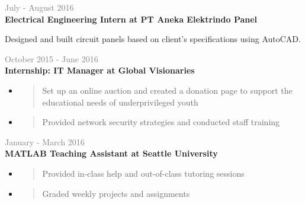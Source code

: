 \documentclass[letterpage]{article}
\begin{document}
\begin{minipage}[t]{0.61\linewidth}
\vspace{7px}
\textcolor{gray}{July - August 2016}\\
\textbf{\textsf{Electrical Engineering Intern
at PT Aneka Elektrindo Panel}}\\
\raggedright
Designed and built circuit panels based on client's
specifications using AutoCAD.

\vspace{7px}
\textcolor{gray}{October 2015 - June 2016}\\
\textbf{\textsf{Internship: IT Manager at Global Visionaries}}\\
\begin{itemize}[leftmargin=*,labelindent=1mm,labelsep=0mm]
\item
  \begin{quote}
  \raggedright
  Set up an online auction and created a donation page to
  support the educational needs of underprivileged youth
  \end{quote}
\item
  \begin{quote}
  \raggedright
  Provided network security strategies and conducted staff
  training
  \end{quote}
\end{itemize}

\vspace{7px}
\textcolor{gray}{January - March 2016}\\
\textbf{\textsf{MATLAB Teaching Assistant at Seattle University}}
\begin{itemize}[leftmargin=*,labelindent=1mm,labelsep=0mm]
\item
  \begin{quote}
  \raggedright
  Provided in-class help and out-of-class tutoring sessions
  \end{quote}
\item
  \begin{quote}
  \raggedright
  Graded weekly projects and assignments
  \end{quote}
\end{itemize}

\end{minipage}
\end{document}
